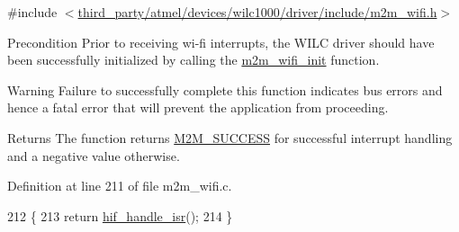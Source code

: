 {\ttfamily \#include $<$\hyperlink{m2m__wifi_8h}{third\+\_\+party/atmel/devices/wilc1000/driver/include/m2m\+\_\+wifi.\+h}$>$}

\begin{DoxyPrecond}{Precondition}
Prior to receiving wi-\/fi interrupts, the W\+I\+LC driver should have been successfully initialized by calling the \hyperlink{group__WifiInitFn_ga73c734812e844d96d860c4e93e9daf35}{m2m\+\_\+wifi\+\_\+init} function.
\end{DoxyPrecond}
\begin{DoxyWarning}{Warning}
Failure to successfully complete this function indicates bus errors and hence a fatal error that will prevent the application from proceeding.
\end{DoxyWarning}
\begin{DoxyReturn}{Returns}
The function returns \hyperlink{nm__common_8h_a9ef27ba27aafdd1aa3a79d3ba2c36b8f}{M2\+M\+\_\+\+S\+U\+C\+C\+E\+SS} for successful interrupt handling and a negative value otherwise. 
\end{DoxyReturn}


Definition at line 211 of file m2m\+\_\+wifi.\+c.


\begin{DoxyCode}
212 \{
213     \textcolor{keywordflow}{return} \hyperlink{m2m__hif_8c_af6391c4821ec23acf31785a5f49a7a3a}{hif\_handle\_isr}();
214 \}
\end{DoxyCode}

